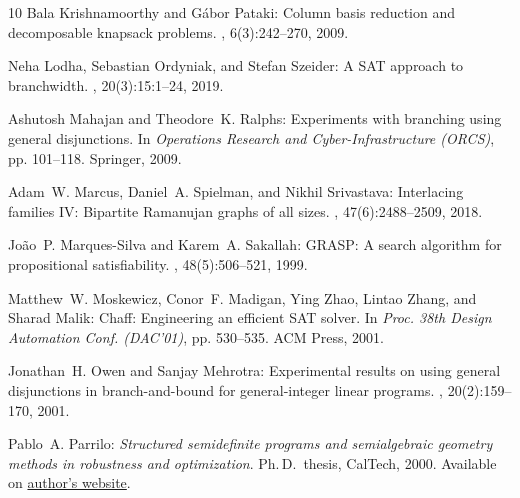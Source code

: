 \documentclass[11pt]{article}
\begin{document}
\begin{thebibliography}{10}
{\sc Bala Krishnamoorthy and G{\'{a}}bor Pataki}: Column basis reduction and
  decomposable knapsack problems.
, 6(3):242--270, 2009.

{\sc Neha Lodha, Sebastian Ordyniak, and Stefan Szeider}: A {SAT} approach to
  branchwidth.
, 20(3):15:1--24, 2019.
\newblock [\epfmtdoi{10.1145/3326159}]

{\sc Ashutosh Mahajan and Theodore~K. Ralphs}: Experiments with branching using
  general disjunctions.
\newblock In {\em Operations Research and Cyber-Infrastructure (ORCS)}, pp.
  101--118. Springer, 2009.
\newblock [\epfmtdoi{10.1007/978-0-387-88843-9\_6}]

{\sc Adam~W. Marcus, Daniel~A. Spielman, and Nikhil Srivastava}: Interlacing
  families {IV:} {B}ipartite {R}amanujan graphs of all sizes.
, 47(6):2488--2509, 2018.
\newblock [\epfmtdoi{10.1137/16M106176X}]

{\sc Jo{\~{a}}o~P. Marques-Silva and Karem~A. Sakallah}: {GRASP:} {A} search
  algorithm for propositional satisfiability.
, 48(5):506--521, 1999.
\newblock [\epfmtdoi{10.1109/12.769433}]

{\sc Matthew~W. Moskewicz, Conor~F. Madigan, Ying Zhao, Lintao Zhang, and
  Sharad Malik}: Chaff: {E}ngineering an efficient {SAT} solver.
\newblock In {\em Proc. 38th Design Automation Conf. (DAC'01)}, pp. 530--535.
  ACM Press, 2001.
\newblock [\epfmtdoi{10.1145/378239.379017}]

{\sc Jonathan~H. Owen and Sanjay Mehrotra}: Experimental results on using
  general disjunctions in branch-and-bound for general-integer linear programs.
, 20(2):159--170, 2001.
\newblock [\epfmtdoi{10.1023/A:1011207119557}]

{\sc Pablo~A. Parrilo}: {\em Structured semidefinite programs and semialgebraic
  geometry methods in robustness and optimization}.
\newblock Ph.\,D.\ thesis, CalTech, 2000.
\newblock Available on
  \href{https://www.mit.edu/~parrilo/pubs/files/thesis.pdf}{author's website}.


\end{thebibliography}
\end{document}
